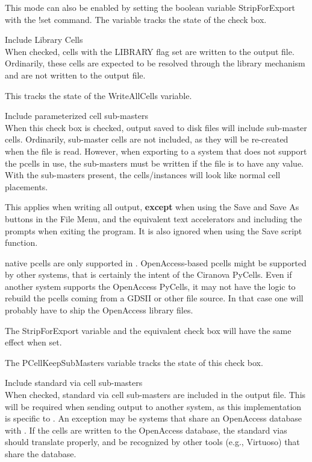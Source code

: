 \begin{description}
This mode can also be enabled by setting the boolean variable {\et
StripForExport} with the {\cb !set} command.  The variable tracks the
state of the check box.

\item{\cb Include Library Cells}\\
When checked, cells with the LIBRARY flag set are written to the
output file.  Ordinarily, these cells are expected to be resolved
through the library mechanism and are not written to the output file.

This tracks the state of the {\et WriteAllCells} variable.

\item{\cb Include parameterized cell sub-masters}\\
When this check box is checked, output saved to disk files will
include sub-master cells.  Ordinarily, sub-master cells are not
included, as they will be re-created when the file is read.  However,
when exporting to a system that does not support the pcells in use,
the sub-masters must be written if the file is to have any value. 
With the sub-masters present, the cells/instances will look like
normal cell placements.

This applies when writing all output, {\bf except} when using the {\cb
Save} and {\cb Save As} buttons in the {\cb File Menu}, and the
equivalent text accelerators and including the prompts when exiting
the program.  It is also ignored when using the {\vt Save} script
function.

{\Xic} native pcells are only supported in {\Xic}.  OpenAccess-based
pcells might be supported by other systems, that is certainly the
intent of the Ciranova PyCells.  Even if another system supports the
OpenAccess PyCells, it may not have the logic to rebuild the pcells
coming from a GDSII or other file source.  In that case one will
probably have to ship the OpenAccess library files.

The {\et StripForExport} variable and the equivalent check box will
have the same effect when set.

The {\et PCellKeepSubMasters} variable tracks the state of this check
box.

\item{\cb Include standard via cell sub-masters}\\
When checked, standard via cell sub-masters are included in the output
file.  This will be required when sending output to another system, as
this implementation is specific to {\Xic}.
An exception may be systems that share an OpenAccess database with
{\Xic}.  If the cells are written to the OpenAccess database, the
standard vias should translate properly, and be recognized by other
tools (e.g., Virtuoso) that share the database.


\end{description}
